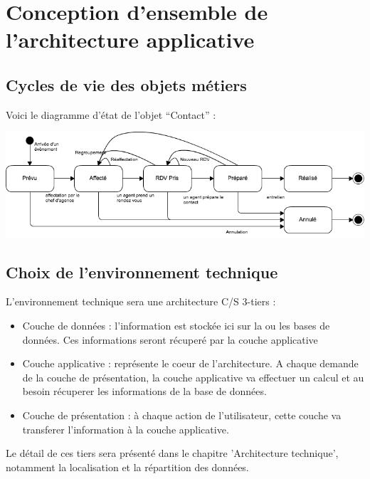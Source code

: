 

\section{Conception d'ensemble de l'architecture applicative}


\subsection{Cycles de vie des objets métiers}

Voici le diagramme d'état de l'objet ``Contact'' :

\begin {center}
\includegraphics[width=\textwidth]{diagramme-etat-objet-contact.png}
\end {center}

\subsection{Choix de l'environnement technique}
L'environnement technique sera une architecture C/S 3-tiers :
\begin{itemize}
\item Couche de données : l'information est stockée ici sur la ou les bases de données. Ces informations seront récuperé par la couche applicative
\item Couche applicative : représente le coeur de l'architecture. A chaque demande de la couche de présentation, la couche applicative va effectuer un calcul et au besoin récuperer les informations de la base de données.
\item Couche de présentation : à chaque action de l'utilisateur, cette couche va transferer l'information à la couche applicative.
\end{itemize}
Le détail de ces tiers sera présenté dans le chapitre 'Architecture technique', notamment la localisation et la répartition des données.